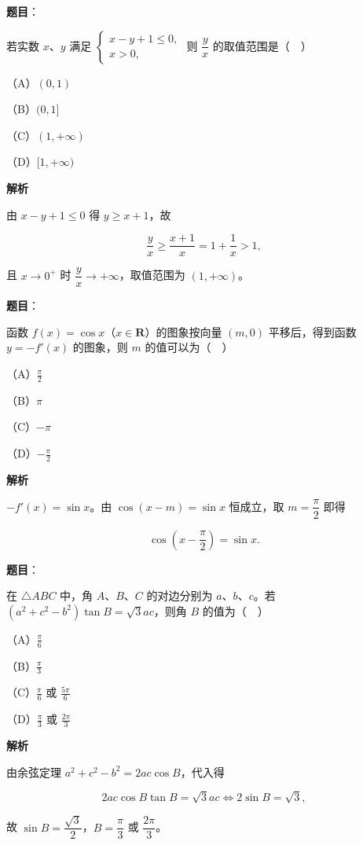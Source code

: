 \begin{answer}

\textbf{题目}：

若实数 $x$、$y$ 满足 $\begin{cases}x-y+1\leqslant0,\\ x>0,\end{cases}$ 则 $\dfrac yx$ 的取值范围是（　）

（A）$(0,1)$

（B）$(0,1]$

（C）$(1,+\infty)$

（D）$[1,+\infty)$

\textbf{解析}

由 $x-y+1\leqslant0$ 得 $y\geqslant x+1$，故

\nopagebreak[4]
\[\frac yx\geqslant\frac{x+1}x=1+\frac1x>1,\]

且 $x\to0^+$ 时 $\dfrac yx\to+\infty$，取值范围为 $(1,+\infty)$。


\end{answer}
\begin{answer}

\textbf{题目}：

函数 $f(x)=\cos x$（$x\in\mathbf R$）的图象按向量 $(m,0)$ 平移后，得到函数 $y=-f'(x)$ 的图象，则 $m$ 的值可以为（　）

（A）$\frac{\pi}{2}$

（B）$\pi$

（C）$-\pi$

（D）$-\frac{\pi}{2}$

\textbf{解析}

$-f'(x)=\sin x$。由 $\cos(x-m)=\sin x$ 恒成立，取 $m=\dfrac{\pi}2$ 即得

\nopagebreak[4]
\[\cos\left(x-\frac{\pi}2\right)=\sin x.\]


\end{answer}
\begin{answer}

\textbf{题目}：

在 $\triangle ABC$ 中，角 $A$、$B$、$C$ 的对边分别为 $a$、$b$、$c$。若 $(a^2+c^2-b^2)\tan B=\sqrt3ac$，则角 $B$ 的值为（　）

（A）$\frac{\pi}{6}$

（B）$\frac{\pi}{3}$

（C）$\frac{\pi}{6}$ 或 $\frac{5\pi}{6}$

（D）$\frac{\pi}{3}$ 或 $\frac{2\pi}{3}$

\textbf{解析}

由余弦定理 $a^2+c^2-b^2=2ac\cos B$，代入得

\nopagebreak[4]
\[2ac\cos B\tan B=\sqrt3ac\iff 2\sin B=\sqrt3,\]

故 $\sin B=\dfrac{\sqrt3}2$，$B=\dfrac{\pi}3$ 或 $\dfrac{2\pi}3$。


\end{answer}
